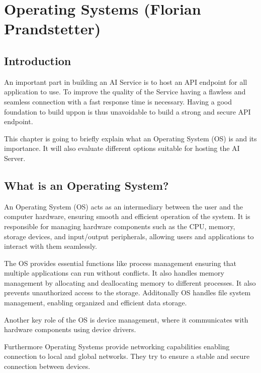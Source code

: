 \chapter{Operating Systems (Florian Prandstetter)}
\label{chap:Operating_Systems_used}


\section {Introduction}

An important part in building an AI Service is to host an API endpoint for all application to use. To improve the quality of the Service having a flawless and seamless connection with a fast response time is necessary.
Having a good foundation to build uppon is thus unavoidable to build a strong and secure API endpoint. 

This chapter is going to briefly explain what an Operating System (OS) is and its importance.
It will also evaluate different options suitable for hosting the AI Server.

\section{What is an Operating System?}

An Operating System (OS) acts as an intermediary between the user and the computer hardware, ensuring smooth and efficient operation of the system. It is responsible for managing hardware components such as the CPU, memory, storage devices, and input/output peripherals, allowing users and applications to interact with them seamlessly.

The OS provides essential functions like process management ensuring that multiple applications can run without conflicts. It also handles memory management by allocating and deallocating memory to different processes. It also prevents unauthorized access to the storage.
Additonally OS handles file system management, enabling organized and efficient data storage. 

Another key role of the OS is device management, where it communicates with hardware components using device drivers.

Furthermore Operating Systems provide networking capabilities enabling connection to local and global networks. They try to ensure a stable and secure connection between devices.


